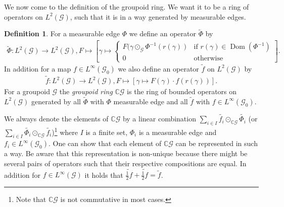 \documentclass[12pt,a4paper]{scrartcl}
\theoremstyle{plain}
\theoremstyle{definition}
\newtheorem{Definition}[Theorem]{Definition}
\newcommand{\C}{\mathbb{C}} %
\newcommand{\2}{\mathbb{Z} / 2 \mathbb{Z}}
\newcommand{\G}{\mathcal{G}}
\newcommand{\1}{\bar{1}}
\newcommand{\0}{\bar{0}}
\newcommand{\Dom}{\operatorname{Dom}}
\begin{document}
We now come to the definition of the groupoid ring. We want it to be a ring of operators on	$L^2(\G)$,  such that it is in a way generated by measurable edges.
\begin{Definition}\label{groupoid_ring}
	For a measurable edge $\Phi$ we define an operator $\tilde \Phi$ by
	\begin{align*}
	\tilde \Phi\colon L^2(\G) \to L^2(\G), F \mapsto \left[\gamma \mapsto \begin{cases}
	F(\gamma \odot_{\G} \Phi^{-1}(r(\gamma)) & \text{if } r(\gamma) \in \Dom(\Phi^{-1}) \\
	0 & \text{otherwise}
	\end{cases} \right] .
	\end{align*}	
	In addition for a map $f \in L^\infty (\G_0)$ we also define an operator $\tilde f$ on $L^2(\G)$ by
	\begin{align*}
	\tilde f\colon L^2(\G) \to L^2(\G), F \mapsto [\gamma \mapsto F(\gamma) \cdot f(r(\gamma))].
	\end{align*}
	For a groupoid $\G$ the \emph{groupoid ring} $\C\G$ is the ring of bounded operators on $L^2(\G)$ generated by all $\tilde{\Phi}$ with $\Phi$ measurable edge and all $\tilde{f}$ with $f \in L^\infty(\G_0)$.
\end{Definition}
We always denote the elements of $\C\G$ by a linear combination $\sum_{i \in I} \widetilde{f_i} \odot_{\C \G} \widetilde{\Phi_i}$ (or $\sum_{i \in I} \widetilde{\Phi_i} \odot_{\C \G} \widetilde{f_i}$)\footnote{Note that $\C\G$ is not commutative in most cases.} where $I$ is a finite set, $\Phi_i$ is a measurable edge and $f_i \in L^\infty(\G_0)$. One can show that each element of $\C \G$ can be represented in such a way. Be aware that this representation is non-unique because there might be several pairs of operators such that their respective compositions are equal. In addition for $f \in L^\infty(\G)$ it holds that $\widetilde{\frac{1}{2}f} + \widetilde{\frac{1}{2}f} = \tilde{f}$. 
\end{document}
